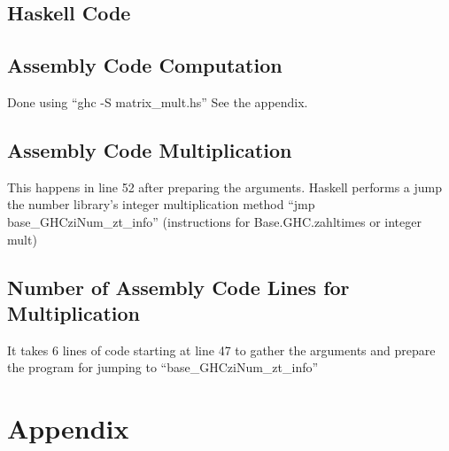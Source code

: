 \documentclass[hidelinks,12pt]{article}
\begin{document}
\subsection{Haskell Code}

\subsection{Assembly Code Computation}
Done using ``ghc -S matrix\_mult.hs'' See the appendix.
\subsection{Assembly Code Multiplication}
This happens in line 52 after preparing the arguments.
Haskell performs a jump the number library's integer multiplication
method ``jmp base\_GHCziNum\_zt\_info'' (instructions for Base.GHC.zahltimes or
integer mult)
\subsection{Number of Assembly Code Lines for Multiplication}
It takes 6 lines of code starting at line 47 to gather the arguments and
prepare the program for jumping to ``base\_GHCziNum\_zt\_info''

\section{Appendix}

\end{document}
